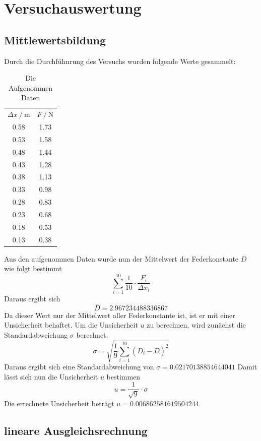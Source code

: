   \section{Versuchauswertung}
  \subsection{Mittlewertsbildung}
Durch die Durchfühnrung des Versuchs wurden folgende Werte gesammelt:
\begin{table}
  \centering
  \caption{Die Aufgenommen Daten}
  \label{tab:Messdaten}
  \begin{tabular}{c c}
  \toprule
  $ \Delta x \:/\: \si{\meter}$ & $F \:/\: \si{\newton}$ \\
  0.58 & 1.73 \\
  0.53 & 1.58 \\
  0.48 & 1.44 \\
  0.43 & 1.28 \\
  0.38 & 1.13 \\
  0.33 & 0.98 \\
  0.28 & 0.83 \\
  0.23 & 0.68 \\
  0.18 & 0.53 \\
  0.13 & 0.38 \\
  \bottomrule
  \end{tabular}
\end{table}
\FloatBarrier
Aus den aufgenommen Daten wurde nun der Mittelwert der Federkonstante $D$ wie folgt bestimmt
\begin{equation}
\sum_{i=1}^{10} \frac{1}{10} \cdot \frac{F_i}{\Delta x_i}
\end{equation}
Daraus ergibt sich
\begin{equation}
\bar{D} = 2.967234488336867
\end{equation}
Da dieser Wert nur der Mittelwert aller Federkonstante ist, ist er mit einer Unsicherheit behaftet.
Um die Unsicherheit $u$ zu berechnen, wird zunächst die Standardabweichung $\sigma$ berechnet.
\begin{equation}
\sigma = \sqrt{\frac{1}{9} \sum_{i=1}^{10} (D_i - \bar{D})^2}
\end{equation}
Daraus ergibt sich eine Standardabweichung von $\sigma = 0.02170138854644041
$
Damit lässt sich nun die Unsicherheit $u$ bestimmen
\begin{equation}
u = \frac{1}{ \sqrt{9}} \cdot \sigma
\end{equation}
Die errechnete Unsicherheit beträgt $u = 0.006862581619504244$

\subsection{lineare Ausgleichsrechnung}

